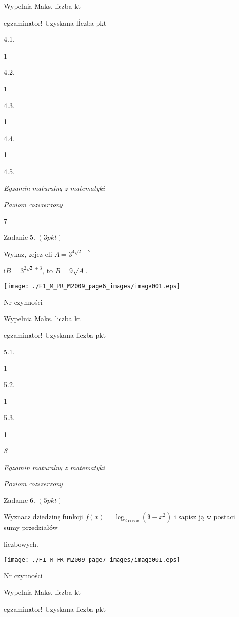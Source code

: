 \documentclass[a4paper,12pt]{article}
\begin{document}
Wypelnia Maks. liczba kt

egzaminator! Uzyskana lÍczba pkt

4.1.

1

4.2.

1

4.3.

1

4.4.

1

4.5.





{\it Egzamin maturalny z matematyki}

{\it Poziom rozszerzony}

7

Zadanie 5. $(3pkt)$

Wykaz, $\dot{\mathrm{z}}\mathrm{e}\mathrm{j}\mathrm{e}\dot{\mathrm{z}}$ eli $A=3^{4\sqrt{2}+2}$

$\mathrm{i} B=3^{2\sqrt{2}+3}$, to $B=9\sqrt{A}.$
\begin{center}
\texttt{[image: ./F1\_M\_PR\_M2009\_page6\_images/image001.eps]}
\end{center}
Nr czynności

Wypelnia Maks. liczba kt

egzaminator! Uzyskana liczba pkt

5.1.

1

5.2.

1

5.3.

1





{\it 8}

{\it Egzamin maturalny z matematyki}

{\it Poziom rozszerzony}

Zadanie 6. $(5pkt)$

Wyznacz dziedzinę funkcji $f(x)=\log_{2\cos x}(9-x^{2})$ i zapisz ją w postaci sumy przedziałów

liczbowych.
\begin{center}
\texttt{[image: ./F1\_M\_PR\_M2009\_page7\_images/image001.eps]}
\end{center}
Nr czynności

Wypelnia Maks. liczba kt

egzaminator! Uzyskana liczba pkt
\end{document}
